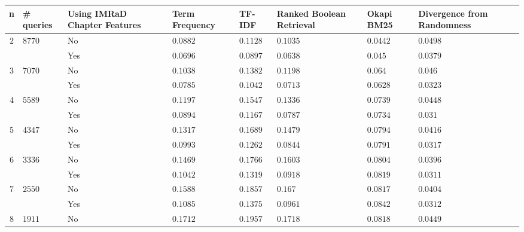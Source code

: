 \begin{table}[b]
  \begin{adjustwidth}{-2cm}{}
    \begin{tabular}{ c C{1.5cm} C{2.1cm} C{2.1cm} C{2.1cm} C{2.1cm} C{2.1cm} C{2.1cm} }
      \toprule
      \textbf{n} & \textbf{\# queries} & \textbf{Using IMRaD Chapter Features} & \textbf{Term Frequency} & \textbf{TF-IDF} & \textbf{Ranked Boolean Retrieval} & \textbf{Okapi BM25} & \textbf{Divergence from Randomness} \\ \midrule
       &  & No  & $0.0882$ & $0.1128$ & $0.1035$ & $0.0442$ & $0.0498$  \\
                                                    && Yes & $0.0696$ & $0.0897$ & $0.0638$ & $0.045$  & $0.0379$  \\ \midrule
       &  & No  & $0.1038$ & $0.1382$ & $0.1198$ & $0.064$  & $0.046$   \\
                                                    && Yes & $0.0785$ & $0.1042$ & $0.0713$ & $0.0628$ & $0.0323$  \\ \midrule
       &  & No  & $0.1197$ & $0.1547$ & $0.1336$ & $0.0739$ & $0.0448$  \\
                                                    && Yes & $0.0894$ & $0.1167$ & $0.0787$ & $0.0734$ & $0.031$   \\ \midrule
       &  & No  & $0.1317$ & $0.1689$ & $0.1479$ & $0.0794$ & $0.0416$  \\
                                                    && Yes & $0.0993$ & $0.1262$ & $0.0844$ & $0.0791$ & $0.0317$  \\ \midrule
       &  & No  & $0.1469$ & $0.1766$ & $0.1603$ & $0.0804$ & $0.0396$  \\
                                                    && Yes & $0.1042$ & $0.1319$ & $0.0918$ & $0.0819$ & $0.0311$  \\ \midrule
       &  & No  & $0.1588$ & $0.1857$ & $0.167$  & $0.0817$ & $0.0404$  \\
                                                    && Yes & $0.1085$ & $0.1375$ & $0.0961$ & $0.0842$ & $0.0312$  \\ \midrule
       &  & No  & $0.1712$ & $0.1957$ & $0.1718$ & $0.0818$ & $0.0449$  \\

\end{tabular}
\end{adjustwidth}
\end{table}
